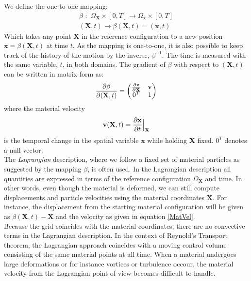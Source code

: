 We define the one-to-one mapping:
\begin{align}
\beta \,\, : \,\, \Omega_{\mathbf{X}} \times [0,T] \rightarrow  \Omega_{\mathbf{x}} \times [0,T] \\
(\mathbf{X},t) \rightarrow \beta(\mathbf{X},t) = (\mathbf{x},t)
\end{align}
Which takes any point $\mathbf{X}$ in the reference configuration to a new position $\mathbf{x} = \beta(\mathbf{X},t)$ at time $t$. As the mapping is one-to-one, it is also possible to keep track of the history of the motion by the inverse, $\beta^{-1}$. The time is measured with the same variable, $t$, in both domains. The gradient of $\beta$ with respect to $(\mathbf{X},t)$ can be written in matrix form as:
\begin{align}
\frac{\partial \beta}{\partial (\mathbf{X},t)} = \begin{pmatrix} \frac{\partial \mathbf{x}}{\partial \mathbf{X}} & \mathbf{v} \\
											0^T & 1
								\end{pmatrix} \label{betaGradient}
\end{align}
where the material velocity
\begin{align} \mathbf{v}(\mathbf{X},t) = \frac{\partial \mathbf{x}}{\partial t}\Big{|}_{\mathbf{X}} \label{MatVel}
\end{align}
is the temporal change in the spatial variable $\mathbf{x}$ while holding \textbf{X} fixed. $0^T$ denotes a null vector. 
\\
The \textit{Lagrangian} description, where we follow a fixed set of material particles as suggested by the mapping $\beta$, is often used. In the Lagrangian description all quantities are expressed in terms of the reference configuration $\Omega_{\mathbf{X}}$ and time. In other words, even though the material is deformed, we can still compute displacements and particle velocities using the material coordinates $\mathbf{X}$. For instance, the displacement from the starting material configuration will be given as $\beta(\mathbf{X},t) - \mathbf{X}$ and the velocity as given in equation \eqref{MatVel}. \\ Because the grid coincides with the material coordinates, there are no convective terms in the Lagrangian description. In the context of Reynold's Transport theorem, the Lagrangian approach coincides with a moving control volume consisting of the same material points at all time. When a material undergoes large deformations or for instance vortices or turbulence occour, the material velocity from the Lagrangian point of view becomes difficult to handle. 
